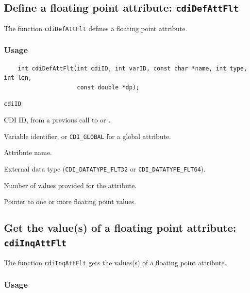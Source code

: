\subsection{Define a floating point attribute: \texttt{cdiDefAttFlt}}
\label{cdiDefAttFlt}

The function {\texttt{cdiDefAttFlt}} defines a floating point attribute.

\subsubsection*{Usage}

\begin{verbatim}
    int cdiDefAttFlt(int cdiID, int varID, const char *name, int type, int len, 
                     const double *dp);
\end{verbatim}

\hspace*{4mm}\begin{minipage}[]{15cm}
\begin{deflist}{\texttt{cdiID}\ }
\item[\texttt{cdiID}]
CDI ID, from a previous call to {} or {}.
\item[\texttt{varID}]
Variable identifier, or {\texttt{CDI\_GLOBAL}} for a global attribute.
\item[\texttt{name}]
Attribute name.
\item[\texttt{type}]
External data type ({\texttt{CDI\_DATATYPE\_FLT32}} or {\texttt{CDI\_DATATYPE\_FLT64}}).
\item[\texttt{len}]
Number of values provided for the attribute.
\item[\texttt{dp}]
Pointer to one or more floating point values.

\end{deflist}
\end{minipage}


\subsection{Get the value(s) of a floating point attribute: \texttt{cdiInqAttFlt}}
\label{cdiInqAttFlt}

The function {\texttt{cdiInqAttFlt}} gets the values(s) of a floating point attribute.

\subsubsection*{Usage}


